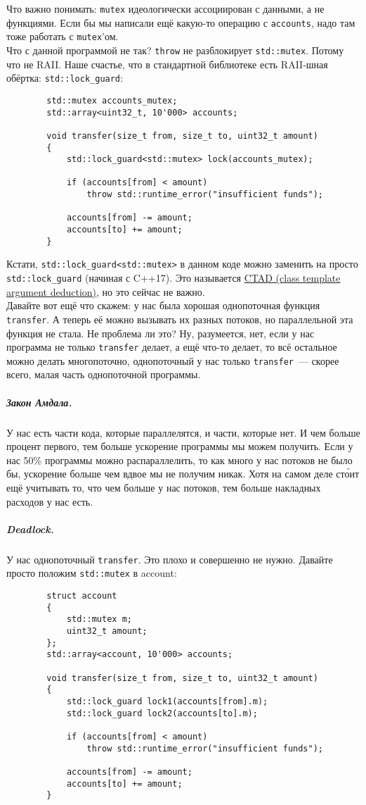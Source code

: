 \documentclass{article}
\begin{document}
    Что важно понимать: \Verb|mutex| идеологически ассоциирован с данными, а не функциями. Если бы мы написали ещё какую-то операцию с \texttt{accounts}, надо там тоже работать с \Verb|mutex|'ом.\\
    Что с данной программой не так? \texttt{throw} не разблокирует \texttt{std::mutex}. Потому что не RAII. Наше счастье, что в стандартной библиотеке есть RAII-шная обёртка: \texttt{std::lock_guard}:
    \begin{verbatim}
        std::mutex accounts_mutex;
        std::array<uint32_t, 10'000> accounts;
        
        void transfer(size_t from, size_t to, uint32_t amount)
        {
            std::lock_guard<std::mutex> lock(accounts_mutex);
            
            if (accounts[from] < amount)
                throw std::runtime_error("insufficient funds");
            
            accounts[from] -= amount;
            accounts[to] += amount;
        }
    \end{verbatim}
    Кстати, \texttt{std::lock_guard<std::mutex>} в данном коде можно заменить на просто \texttt{std::lock_guard} (начиная с C++17). Это называется \href{https://en.cppreference.com/w/cpp/language/class_template_argument_deduction}{CTAD (class template argument deduction)}, но это сейчас не важно.\\
    Давайте вот ещё что скажем: у нас была хорошая однопоточная функция \texttt{transfer}. А теперь её можно вызывать их разных потоков, но параллельной эта функция не стала. Не проблема ли это? Ну, разумеется, нет, если у нас программа не только \texttt{transfer} делает, а ещё что-то делает, то всё остальное можно делать многопоточно, однопоточный у нас только \texttt{transfer}~--- скорее всего, малая часть однопоточной программы.
    \subparagraph{Закон Амдала.}
    У нас есть части кода, которые параллелятся, и части, которые нет. И чем больше процент первого, тем больше ускорение программы мы можем получить. Если у нас 50\% программы можно распараллелить, то как много у нас потоков не было бы, ускорение больше чем вдвое мы не получим никак. Хотя на самом деле ст\'{о}ит ещё учитывать то, что чем больше у нас потоков, тем больше накладных расходов у нас есть.
    \subparagraph{Deadlock.}
    У нас однопоточный \texttt{transfer}. Это плохо и совершенно не нужно. Давайте просто положим \texttt{std::mutex} в account:
    \begin{verbatim}
        struct account
        {
            std::mutex m;
            uint32_t amount;
        };
        std::array<account, 10'000> accounts;
        
        void transfer(size_t from, size_t to, uint32_t amount)
        {
            std::lock_guard lock1(accounts[from].m);
            std::lock_guard lock2(accounts[to].m);
            
            if (accounts[from] < amount)
                throw std::runtime_error("insufficient funds");
            
            accounts[from] -= amount;
            accounts[to] += amount;
        }
    \end{verbatim}
\end{document}
